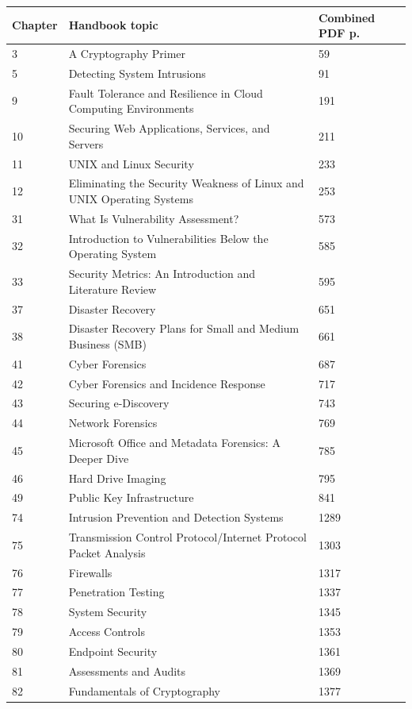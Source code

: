 \documentclass[10pt,letterpaper,oneside]{article}
\begin{document}
\par\medskip\noindent\begin{longtable}{@{}p{}p{}p{}@{}}\toprule Chapter & Handbook topic & Combined PDF p. \\ \midrule\endhead3 & A Cryptography Primer & 59 \\
5 & Detecting System Intrusions & 91 \\
9 & Fault Tolerance and Resilience in Cloud Computing Environments & 191 \\
10 & Securing Web Applications, Services, and Servers & 211 \\
11 & UNIX and Linux Security & 233 \\
12 & Eliminating the Security Weakness of Linux and UNIX Operating Systems & 253 \\
31 & What Is Vulnerability Assessment? & 573 \\
32 & Introduction to Vulnerabilities Below the Operating System & 585 \\
33 & Security Metrics: An Introduction and Literature Review & 595 \\
37 & Disaster Recovery & 651 \\
38 & Disaster Recovery Plans for Small and Medium Business (SMB) & 661 \\
41 & Cyber Forensics & 687 \\
42 & Cyber Forensics and Incidence Response & 717 \\
43 & Securing e-Discovery & 743 \\
44 & Network Forensics & 769 \\
45 & Microsoft Office and Metadata Forensics: A Deeper Dive & 785 \\
46 & Hard Drive Imaging & 795 \\
49 & Public Key Infrastructure & 841 \\
74 & Intrusion Prevention and Detection Systems & 1289 \\
75 & Transmission Control Protocol/Internet Protocol Packet Analysis & 1303 \\
76 & Firewalls & 1317 \\
77 & Penetration Testing & 1337 \\
78 & System Security & 1345 \\
79 & Access Controls & 1353 \\
80 & Endpoint Security & 1361 \\
81 & Assessments and Audits & 1369 \\
82 & Fundamentals of Cryptography & 1377 \\
\bottomrule\end{longtable}\par\medskip
\end{document}
